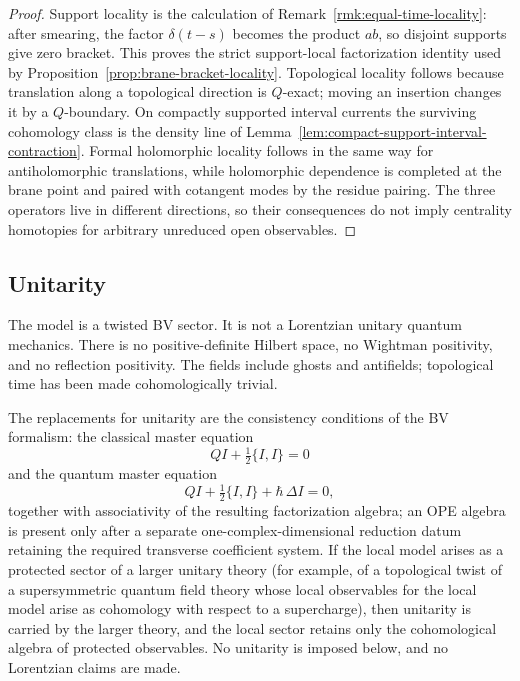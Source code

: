 \documentclass[11pt]{memoir}
\begin{document}
\begin{proof}
  Support locality is the calculation of
  Remark~\ref{rmk:equal-time-locality}: after smearing, the factor
  \(\delta(t-s)\) becomes the product \(ab\), so disjoint supports give
  zero bracket. This proves the strict support-local factorization
  identity used by Proposition~\ref{prop:brane-bracket-locality}.
  Topological locality follows because translation along a topological
  direction is \(Q\)-exact; moving an insertion changes it by a
  \(Q\)-boundary. On compactly supported interval currents the surviving
  cohomology class is the density line of
  Lemma~\ref{lem:compact-support-interval-contraction}. Formal
  holomorphic locality follows in the same way for antiholomorphic
  translations, while holomorphic dependence is completed at the brane
  point and paired with cotangent modes by the residue pairing. The three
  operators live in different directions, so their consequences do not
  imply centrality homotopies for arbitrary unreduced open observables.
\end{proof}

\subsection{Unitarity}

The model is a twisted BV sector. It is not a Lorentzian unitary quantum
mechanics. There is no positive-definite Hilbert space, no Wightman
positivity, and no reflection positivity. The fields include ghosts and
antifields; topological time has been made cohomologically trivial.

The replacements for unitarity are the consistency conditions of the BV
formalism: the classical master equation
$$QI+\tfrac12\{I,I\}=0$$
and the quantum master equation
$$QI+\tfrac12\{I,I\}+\hbar\,\Delta I=0,$$
together with associativity of the resulting factorization algebra; an
OPE algebra is present only after a separate one-complex-dimensional
reduction datum retaining the required transverse coefficient system.  If
the local model arises as a protected sector of a larger unitary theory
(for example, of a topological twist of a supersymmetric quantum field
theory whose local observables for the local model arise as cohomology
with respect to a supercharge), then unitarity is carried by the larger
theory, and the local sector retains only the cohomological algebra of
protected observables. No unitarity is imposed below, and no Lorentzian
claims are made.
\end{document}
